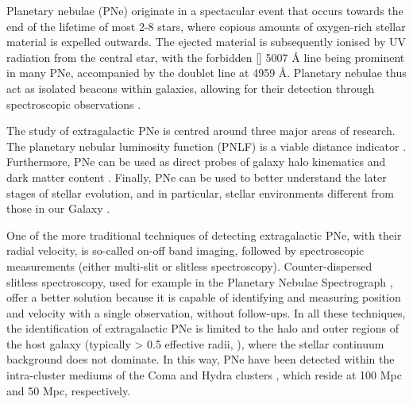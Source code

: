 \documentclass{aa}
\begin{document}
Planetary nebulae (PNe) originate in a spectacular event that occurs towards the end of the lifetime of most 2-8  stars, where copious amounts of oxygen-rich stellar material is expelled outwards. The ejected material is subsequently ionised by UV radiation from the central star, with the forbidden [] 5007 \AA{} line being prominent in many PNe, accompanied by the doublet line at 4959 \AA{}. Planetary nebulae thus act as isolated beacons within galaxies, allowing for their detection through spectroscopic observations \citep[e.g.][]{paczynski_evolution_1971, dopita_theoretical_1992}.


The study of extragalactic PNe is centred around three major areas of research. The planetary nebular luminosity function (PNLF) is a viable distance indicator \citep{ciardullo_planetary_1989}. Furthermore, PNe can be used as direct probes of galaxy halo kinematics and dark matter content \citep{romanowsky_dearth_2003, douglas_pns_2007, coccato_kinematic_2009, kafle_need_2018, longobardi_kinematics_2018, pulsoni_extended_2018, bhattacharya_survey_2019}. Finally, PNe can be used to better understand the later stages of stellar evolution, and in particular, stellar environments different from those in our Galaxy \citep[e.g. stellar metallicity and kinematics;][]{marigo_evolution_2004}.


One of the more traditional techniques of detecting extragalactic PNe, with their radial velocity, is so-called on-off band imaging, followed by spectroscopic measurements (either multi-slit or slitless spectroscopy). Counter-dispersed slitless spectroscopy, used for example in the Planetary Nebulae Spectrograph \citep[][an instrument that is entirely dedicated to the study of extragalactic PNe]{douglas_pns_2007}, offer a better solution because it is capable of identifying and measuring position and velocity with a single observation, without follow-ups. In all these techniques, the identification of extragalactic PNe is limited to the halo and outer regions of the host galaxy (typically > 0.5 effective radii, ), where the stellar continuum background does not dominate. In this way, PNe have been detected within the intra-cluster mediums of the Coma and Hydra clusters \citep{gerhard_detection_2005, ventimiglia_unmixed_2011}, which reside at 100 Mpc and 50 Mpc, respectively.
\end{document}

